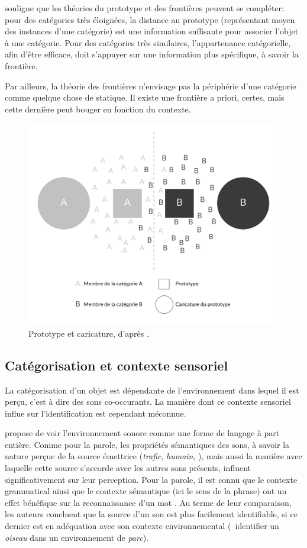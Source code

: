 \citep{goldstone2003concepts} souligne que les théories du prototype et des frontières peuvent se compléter: pour des catégories très éloignées, la distance au prototype (représentant moyen des instances d'une catégorie) est une information suffisante pour associer l'objet à une catégorie. Pour des catégories très similaires, l’appartenance catégorielle, afin d'être efficace, doit s'appuyer sur une information plus spécifique, à savoir la frontière.

Par ailleurs, la théorie des frontières n'envisage pas la périphérie d'une catégorie comme quelque chose de statique. Il existe une frontière a priori, certes, mais cette dernière peut bouger en fonction du contexte.

\begin{figure}[t]
        \myfloatalign
        \includegraphics[width=.8\linewidth]{gfx/ch_3/prototypeCaricature}
        \caption[Prototype et caricature.]{Prototype et caricature, d'après \citep{davis2010memory}.}\label{fig:prototypeCaricature}
\end{figure}

\subsection{Catégorisation et contexte sensoriel}
\label{sec:ch3_categoEtContexte}

La catégorisation d'un objet est dépendante de l'environnement dans lequel il est perçu, c'est à dire des sons co-occurants. La manière dont ce contexte sensoriel influe sur l'identification est cependant méconnue.

\citep{ballas1987interpreting} propose de voir l'environnement sonore comme une forme de langage à part entière. Comme pour la parole, les propriétés sémantiques des sons, à savoir la nature perçue de la source émettrice (\emph{trafic}, \emph{humain}, \etc), mais aussi la manière avec laquelle cette source s'accorde avec les autres sons présents, influent significativement sur leur perception. Pour la parole, il est connu que le contexte grammatical ainsi que le contexte sémantique (ici le sens de la phrase) ont un effet bénéfique sur la reconnaissance d'un mot \citep{bilger1984standardization}. Au terme de leur comparaison, les auteurs concluent que la source d'un son est plus facilement identifiable, si ce dernier est en adéquation avec son contexte environnemental (\eg~identifier un \emph{oiseau} dans un environnement de \emph{parc}).

